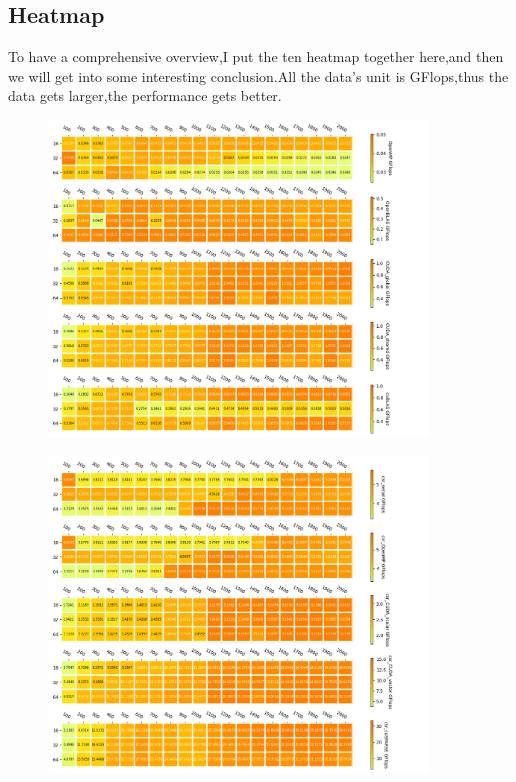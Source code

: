 \documentclass[11pt]{scrartcl} %
\begin{document}
\subsection{Heatmap}
To have a comprehensive overview,I put the ten heatmap together here,and then we will get into some interesting conclusion.All the data's unit is GFlops,thus the data gets larger,the performance gets better.
\begin{figure}[H]
    \centering
    \includegraphics[width=0.9\textwidth]{Figure_1.png}
    \label{}
\end{figure}
\begin{figure}[H]
    \centering
    \includegraphics[width=0.9\textwidth]{Figure_2.png}
    \label{}
\end{figure}
\end{document}
